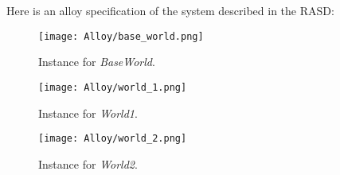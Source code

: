 Here is an alloy specification of the system described in the RASD: 
\vspace{2cm}

\newpage

\begin{figure}[H]
    \begin{center}
        \texttt{[image: Alloy/base\_world.png]}
        \caption{Instance for \textit{BaseWorld}.}
        \label{fig:BaseWorld}%
    \end{center}
\end{figure}

\begin{figure}[H]
    \begin{center}
        \texttt{[image: Alloy/world\_1.png]}
        \caption{Instance for \textit{World1}.}
        \label{fig:World1}%
    \end{center}
\end{figure}


\begin{figure}[H]
    \begin{center}
        \texttt{[image: Alloy/world\_2.png]}
        \caption{Instance for \textit{World2}.}
        \label{fig:World2}%
    \end{center}
\end{figure}